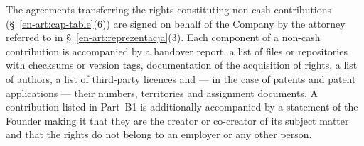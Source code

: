 \documentclass[12pt,a4paper]{report}
\begin{document}
The agreements transferring the rights constituting non-cash contributions (\S~\ref{en-art:cap-table}(6)) are signed on behalf of the Company by the attorney referred to in \S~\ref{en-art:reprezentacja}(3). Each component of a non-cash contribution is accompanied by a handover report, a list of files or repositories with checksums or version tags, documentation of the acquisition of rights, a list of authors, a list of third-party licences and --- in the case of patents and patent applications --- their numbers, territories and assignment documents. A contribution listed in Part~B1 is additionally accompanied by a statement of the Founder making it that they are the creator or co-creator of its subject matter and that the rights do not belong to an employer or any other person.


\end{document}
